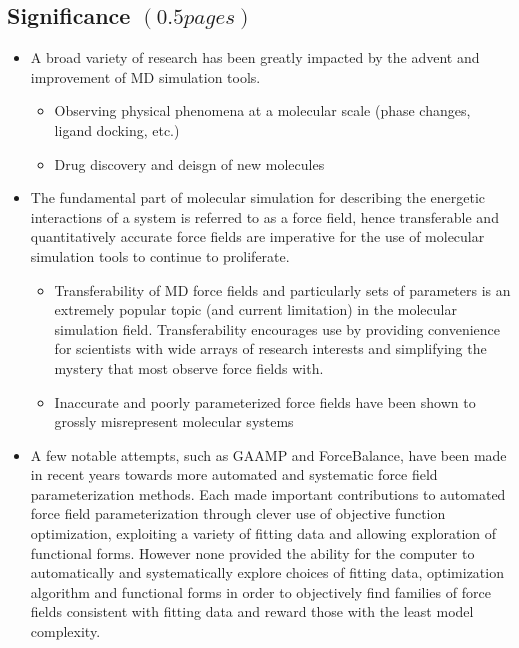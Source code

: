 \documentclass[aps,pre,onecolumn,nofootinbib,superscriptaddress,linenumbers,12pt,draft,tightenlines,notitlepage]{revtex4-1}
\begin{document}
\subsection{Significance $\left(0.5 pages\right)$}
\begin{itemize}
 \item A broad variety of research has been greatly impacted by the advent and improvement of MD simulation tools.  
  \begin{itemize}
   \item Observing physical phenomena at a molecular scale (phase changes, ligand docking, etc.)\cite{villin}
   \item Drug discovery and deisgn of new molecules\cite{drug_discov}
  \end{itemize}
 \item The fundamental part of molecular simulation for describing the energetic interactions of a system is referred to as a force field, hence transferable and quantitatively accurate force fields are imperative for the use of molecular simulation tools to continue to proliferate.
  \begin{itemize}
   \item Transferability of MD force fields and particularly sets of parameters is an extremely popular topic (and current limitation) in the molecular simulation field.\cite{transferability1,transferability2,transferability3,transferability4} Transferability encourages use by providing convenience for scientists with wide arrays of research interests and simplifying the mystery that most observe force fields with.
   \item Inaccurate and poorly parameterized force fields have been shown to grossly misrepresent molecular systems\cite{ffcomp1,ffcomp2}
  \end{itemize}
 \item A few notable attempts, such as GAAMP and ForceBalance, have been made in recent years towards more automated and systematic force field parameterization methods.\cite{GAAMP,FB1,FB2,FB3} Each made important contributions to automated force field parameterization through clever use of objective function optimization, exploiting a variety of fitting data and allowing exploration of functional forms. However none provided the ability for the computer to automatically and systematically explore choices of fitting data, optimization algorithm and functional forms in order to objectively find families of force fields consistent with fitting data and reward those with the least model complexity.  
\end{itemize}
\end{document}

